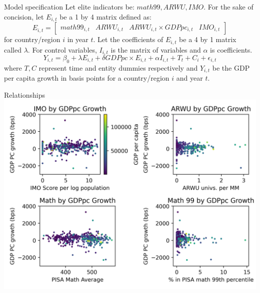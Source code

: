 \documentclass[10pt]{beamer}
\begin{document}
\begin{frame}{Model specification}
    Let elite indicators be: $math99, ARWU, IMO$.
    For the sake of concision, let $E_{i,t}$ be a 1 by 4 matrix defined as:
    \[E_{i,t} = 
    \begin{bmatrix}
        math99_{i, t} & ARWU_{i, t} & ARWU_{i, t} \times GDPpc_{i, t} & IMO_{i, t}
    \end{bmatrix}
    \] for country/region $i$ in year $t$.
    Let the coefficients of $E_{i, t}$ be a 4 by 1 matrix called $\lambda$. For control variables, $I_{i, t}$ is the matrix of variables and $\alpha$ is coefficients.
    \begin{equation}
        Y_{i, t} = \beta_0 + \lambda E_{i, t} + \delta GDPpc \times E_{i,t} + \alpha I_{i, t} + T_t + C_i + \epsilon_{i, t}
    \end{equation}
    where $T,C$ represent time and entity dummies respectively and $Y_{i,t}$ be the GDP per capita growth in basis points for a country/region $i$ and year $t$.
\end{frame}

\begin{frame}{Relationships}
    \centering
    \includegraphics[width=\textwidth]{../charts/relationships.png}
\end{frame}
\end{document}
